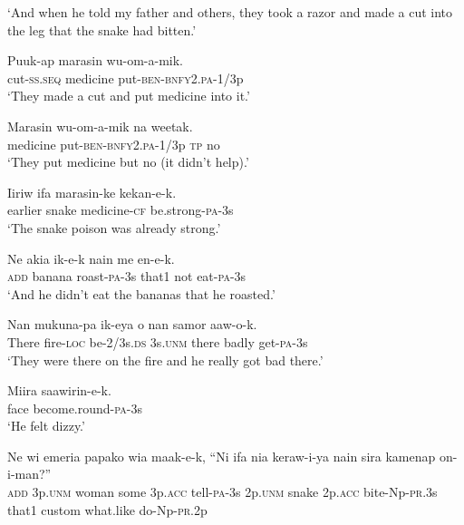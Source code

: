 \glt ‘And when he told my father and others, they took a razor and made a cut into the leg that the snake had bitten.’ \\
\z


\ea
\gll  Puuk-ap  marasin  wu-om-a-mik. \\
cut-\textsc{ss.seq}  medicine  put-\textsc{ben}-\textsc{bnfy}2.\textsc{pa}-1/3p \\
\glt ‘They made a cut and put medicine into it.’ \\
\z


\ea
\gll  Marasin  wu-om-a-mik  na  weetak. \\
medicine  put-\textsc{ben}-\textsc{bnfy}2.\textsc{pa}-1/3p  \textsc{tp}  no \\
\glt ‘They put medicine but no (it didn’t help).’ \\
\z


\ea
\gll  Iiriw  ifa  marasin-ke  kekan-e-k. \\
earlier  snake  medicine-\textsc{cf}  be.strong-\textsc{pa}-3s \\
\glt ‘The snake poison was already strong.’ \\
\z


\ea
\gll  Ne  akia  ik-e-k  nain  me  en-e-k. \\
\textsc{add}  banana  roast-\textsc{pa}-3s  that1  not  eat-\textsc{pa}-3s \\
\glt ‘And he didn’t eat the bananas that he roasted.’ \\
\z


\ea
\gll  Nan  mukuna-pa  ik-eya  o  nan  samor  aaw-o-k. \\
There  fire-\textsc{loc}  be-2/3s.\textsc{ds}  3s.\textsc{unm}  there  badly  get-\textsc{pa}-3s \\
\glt ‘They were there on the fire and he really got bad there.’ \\
\z


\ea
\gll  Miira  saawirin-e-k. \\
face  become.round-\textsc{pa}-3s \\
\glt ‘He felt dizzy.’ \\
\z


\ea
\gll  Ne  wi  emeria  papako  wia  maak-e-k,  “Ni  ifa       nia  keraw-i-ya  nain  sira  kamenap  on-i-man?” \\
\textsc{add}  3p.\textsc{unm}  woman  some  3p.\textsc{acc}  tell-\textsc{pa}-3s  2p.\textsc{unm}  snake  2p.\textsc{acc}  bite-Np-\textsc{pr}.3s  that1  custom  what.like  do-Np-\textsc{pr}.2p \\


